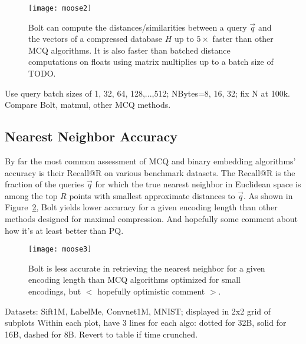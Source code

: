 \begin{figure}[h]
\begin{center}
\label{fig:query_speeds}
\texttt{[image: moose2]}
\vspace*{-1mm}
\caption{Bolt can compute the distances/similarities between a query $\vec{q}$ and the vectors of a compressed database $H$ up to $5\times$ faster than other MCQ algorithms. It is also faster than batched distance computations on floats using matrix multiplies up to a batch size of TODO.}
\end{center}
\end{figure}



Use query batch sizes of {1, 32, 64, 128,...,512}; NBytes={8, 16, 32}; fix N at 100k. Compare Bolt, matmul, other MCQ methods.


\subsection{Nearest Neighbor Accuracy}

By far the most common assessment of MCQ and binary embedding algorithms' accuracy is their Recall@R on various benchmark datasets. The Recall@R is the fraction of the queries $\vec{q}$ for which the true nearest neighbor in Euclidean space is among the top $R$ points with smallest approximate distances to $\vec{q}$. As shown in Figure~\ref{fig:nn_acc}, Bolt yields lower accuracy for a given encoding length than other methods designed for maximal compression. And hopefully some comment about how it's at least better than PQ.

\begin{figure}[h]
\begin{center}
\label{fig:nn_acc}
\texttt{[image: moose3]}
\vspace*{-1mm}
\caption{Bolt is less accurate in retrieving the nearest neighbor for a given encoding length than MCQ algorithms optimized for small encodings, but $<$ hopefully optimistic comment $>$.}
\end{center}
\end{figure}

Datasets: Sift1M, LabelMe, Convnet1M, MNIST; displayed in 2x2 grid of subplots
Within each plot, have 3 lines for each algo: dotted for 32B, solid for 16B, dashed for 8B.
Revert to table if time crunched.



